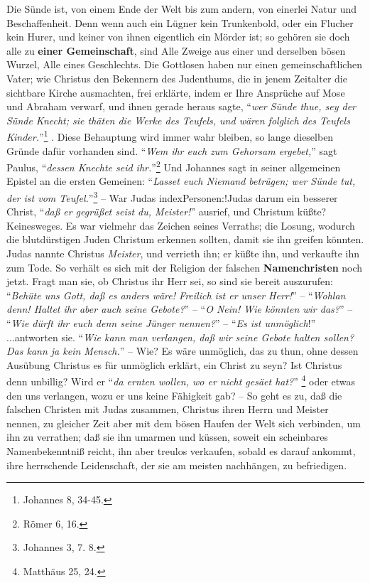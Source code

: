  Die Sünde ist, von einem Ende der Welt bis zum andern, von einerlei Natur und Beschaffenheit. Denn wenn auch ein Lügner kein Trunkenbold, oder ein Flucher kein Hurer, und keiner von ihnen eigentlich ein Mörder ist; so gehören sie doch alle zu \textbf{einer Gemeinschaft}, sind Alle Zweige aus einer und derselben bösen Wurzel, Alle eines Geschlechts. Die Gottlosen haben nur einen gemeinschaftlichen Vater; wie Christus den Bekennern des Judenthums, die in jenem Zeitalter die sichtbare Kirche ausmachten, frei erklärte, indem er Ihre Ansprüche auf Mose und Abraham   verwarf, und ihnen gerade heraus sagte, "`\textit{wer Sünde thue, sey der Sünde Knecht; sie thäten die Werke des Teufels, und wären folglich des Teufels Kinder.}"'\footnote{Johannes 8, 34-45.} .
 Diese Behauptung wird immer wahr bleiben, so lange dieselben Gründe dafür vorhanden sind. "`\textit{Wem ihr euch zum Gehorsam ergebet,}"' sagt Paulus, "`\textit{dessen Knechte seid ihr.}"'\footnote{Römer 6, 16.}  Und Johannes sagt in seiner allgemeinen Epistel an die ersten Gemeinen: "`\textit{Lasset euch Niemand betrügen; wer Sünde tut, der ist vom Teufel.}"'\footnote{Johannes 3, 7. 8.}  -- War Judas index{Personen:!Judas} darum ein besserer Christ, "`\textit{daß er gegrüßet seist du, Meister!}"' ausrief, und Christum küßte?
Keinesweges.
Es war vielmehr das Zeichen seines Verraths;
die Losung, wodurch die blutdürstigen Juden Christum erkennen sollten, damit sie ihn greifen könnten. Judas nannte Christus \textit{Meister}, und verrieth ihn;
er küßte ihn, und verkaufte ihn zum Tode.
So verhält es sich mit der Religion der falschen \textbf{Namenchristen}  noch jetzt.
Fragt man sie, ob Christus ihr Herr sei,
so sind sie bereit auszurufen:
"`\textit{Behüte uns Gott, daß es anders wäre! Freilich ist er unser Herr!}"'
-- "`\textit{Wohlan denn! Haltet ihr aber auch seine Gebote?}"'
-- "`\textit{O Nein! Wie könnten wir das?}"'
-- "`\textit{Wie dürft ihr euch denn seine Jünger nennen?}"'
-- "`\textit{Es ist unmöglich}!"'
...antworten sie.
"`\textit{Wie kann man verlangen, daß wir seine Gebote halten sollen? Das kann ja kein Mensch.}"'
-- Wie? Es wäre unmöglich, das zu thun, ohne dessen Ausübung Christus es für unmöglich erklärt, ein Christ zu seyn? Ist Christus denn unbillig? Wird er "`\textit{da ernten wollen, wo er nicht gesäet hat?}"' \footnote{Matthäus 25, 24.}  oder etwas den uns verlangen, wozu er uns keine Fähigkeit gab?
-- So geht es zu, daß die falschen Christen mit Judas zusammen, Christus ihren Herrn und Meister nennen, zu gleicher Zeit aber mit dem bösen Haufen der Welt sich verbinden, um ihn zu verrathen;
daß sie ihn umarmen und küssen, soweit ein scheinbares Namenbekenntniß  reicht, ihn aber treulos verkaufen, sobald es darauf ankommt, ihre herrschende Leidenschaft, der sie am meisten nachhängen, zu befriedigen.

